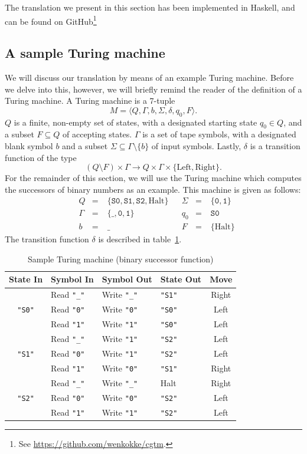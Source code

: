 \documentclass[11pt]{article}
\def\t#1{\texttt{#1}}
\begin{document}
The translation we present in this section has been implemented in Haskell, and
can be found on GitHub\footnote{%
  See \url{https://github.com/wenkokke/cgtm}.
}

\subsection{A sample Turing machine}
We will discuss our translation by means of an example Turing machine. Before we
delve into this, however, we will briefly remind the reader of the definition of
a Turing machine. A Turing machine is a 7-tuple
\[
  M = \langle Q, \Gamma, b, \Sigma, \delta, q_0, F \rangle.
\]
$Q$ is a finite, non-empty set of states, with a designated starting state $q_0
\in Q$, and a subset $F \subseteq Q$ of accepting states. $\Gamma$ is a set of
tape symbols, with a designated blank symbol $b$ and a subset $\Sigma \subseteq
\Gamma \setminus \{b\}$ of input symbols. Lastly, $\delta$ is a transition
function of the type
\[
  (Q \setminus F) \times \Gamma \to Q \times \Gamma \times \{\text{Left},\text{Right}\}.
\]
For the remainder of this section, we will use the Turing machine which computes
the successors of binary numbers as an example. This machine is given as follows:
\[\!
\begin{aligned}
  &Q&      \!\!\!\!=\;& \{\t{S0}, \t{S1}, \t{S2}, \text{Halt}\} &&\Sigma& \!\!\!\!=\;& \{\t{0}, \t{1}\} \\
  &\Gamma& \!\!\!\!=\;& \{\t{\_}, \t{0}, \t{1}\}                &&q_0&    \!\!\!\!=\;& \t{S0} \\
  &b&      \!\!\!\!=\;& \t{\_}                                  &&F&      \!\!\!\!=\;& \{\text{Halt}\}
\end{aligned}
\]
The transition function $\delta$ is described in table~\ref{tab:tm}.
%
\begin{table}[h]
  \centering
  \begin{tabular}{cl|llc}
    \textbf{State In} & \textbf{Symbol In} & \textbf{Symbol Out} & \textbf{State Out} & \textbf{Move} \\ \hline
                   & Read \t{"\_"} & Write \t{"\_"} & \t{"S1"} & Right \\
    \t{"S0"}       & Read \t{"0"}  & Write \t{"0"}  & \t{"S0"} & Left  \\
                   & Read \t{"1"}  & Write \t{"1"}  & \t{"S0"} & Left  \\ \cline{1-5}
                   & Read \t{"\_"} & Write \t{"1"}  & \t{"S2"} & Left  \\
    \t{"S1"}       & Read \t{"0"}  & Write \t{"1"}  & \t{"S2"} & Left  \\
                   & Read \t{"1"}  & Write \t{"0"}  & \t{"S1"} & Right \\ \cline{1-5}
                   & Read \t{"\_"} & Write \t{"\_"} & Halt     & Right \\ 
    \t{"S2"}       & Read \t{"0"}  & Write \t{"0"}  & \t{"S2"} & Left  \\
                   & Read \t{"1"}  & Write \t{"1"}  & \t{"S2"} & Left  
  \end{tabular}
  \caption{Sample Turing machine (binary successor function)}
  \label{tab:tm}
\end{table}
\end{document}
